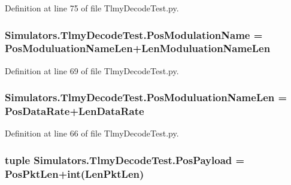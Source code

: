 Definition at line 75 of file Tlmy\+Decode\+Test.\+py.

\hypertarget{namespace_simulators_1_1_tlmy_decode_test_a9688c74d47ddf71d0cd7e01892aafc1e}{}
\subsubsection[{Pos\+Modulation\+Name}]{\setlength{\rightskip}{0pt plus 5cm}Simulators.\+Tlmy\+Decode\+Test.\+Pos\+Modulation\+Name = {\bf Pos\+Moduluation\+Name\+Len}+{\bf Len\+Moduluation\+Name\+Len}}\label{namespace_simulators_1_1_tlmy_decode_test_a9688c74d47ddf71d0cd7e01892aafc1e}


Definition at line 69 of file Tlmy\+Decode\+Test.\+py.

\hypertarget{namespace_simulators_1_1_tlmy_decode_test_a212d60466a9d2f07d790df5fad591706}{}
\subsubsection[{Pos\+Moduluation\+Name\+Len}]{\setlength{\rightskip}{0pt plus 5cm}Simulators.\+Tlmy\+Decode\+Test.\+Pos\+Moduluation\+Name\+Len = {\bf Pos\+Data\+Rate}+{\bf Len\+Data\+Rate}}\label{namespace_simulators_1_1_tlmy_decode_test_a212d60466a9d2f07d790df5fad591706}


Definition at line 66 of file Tlmy\+Decode\+Test.\+py.

\hypertarget{namespace_simulators_1_1_tlmy_decode_test_aa0a0b8ac56fb8ee3d68a1bb4bf9777b0}{}
\subsubsection[{Pos\+Payload}]{\setlength{\rightskip}{0pt plus 5cm}tuple Simulators.\+Tlmy\+Decode\+Test.\+Pos\+Payload = {\bf Pos\+Pkt\+Len}+int({\bf Len\+Pkt\+Len})}\label{namespace_simulators_1_1_tlmy_decode_test_aa0a0b8ac56fb8ee3d68a1bb4bf9777b0}


